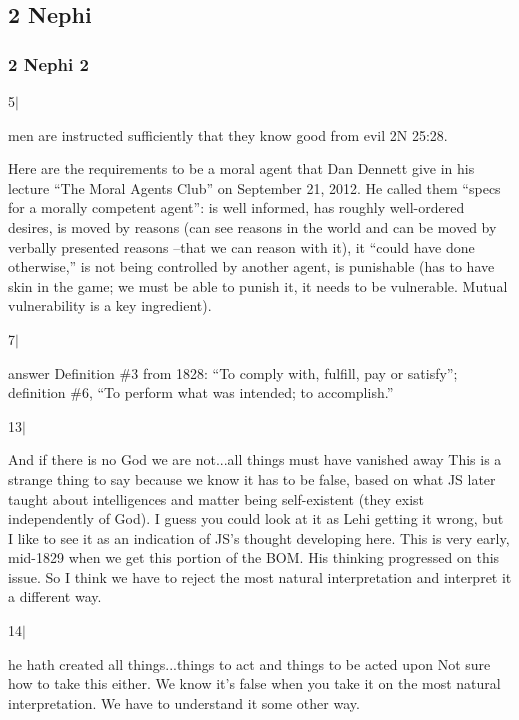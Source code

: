 \subsection{2 Nephi} %

	\subsubsection{2 Nephi 2} %

		\begin{compactdesc}

		\item[5$\vert$]
		\begin{compactdesc}
		\item[men are instructed sufficiently that they know good from evil] 2N 25:28.

		Here are the requirements to be a moral agent that Dan Dennett give in his lecture ``The Moral Agents Club'' on September 21, 2012. He called them ``specs for a morally competent agent'': is well informed, has roughly well-ordered desires, is moved by reasons (can see reasons in the world and can be moved by verbally presented reasons --that we can reason with it), it ``could have done otherwise,'' is not being controlled by another agent, is punishable (has to have skin in the game; we must be able to punish it, it needs to be vulnerable. Mutual vulnerability is a key ingredient).
		\end{compactdesc}
		
		\item[7$\vert$]
		\begin{compactdesc}
		\item[answer] Definition \#3 from 1828: ``To comply with, fulfill, pay or satisfy''; definition \#6, ``To perform what was intended; to accomplish.''
		\end{compactdesc}
		
		\item[13$\vert$]
		\begin{compactdesc}
		\item[And if there is no God we are not...all things must have vanished away] This is a strange thing to say because we know it has to be false, based on what JS later taught about intelligences and matter being self-existent (they exist independently of God). I guess you could look at it as Lehi getting it wrong, but I like to see it as an indication of JS's thought developing here. This is very early, mid-1829 when we get this portion of the BOM. His thinking progressed on this issue. So I think we have to reject the most natural interpretation and interpret it a different way.
		\end{compactdesc}
		
		\item[14$\vert$]
		\begin{compactdesc}
		\item[he hath created all things...things to act and things to be acted upon] Not sure how to take this either. We know it's false when you take it on the most natural interpretation. We have to understand it some other way.
		\end{compactdesc}

		\end{compactdesc}

